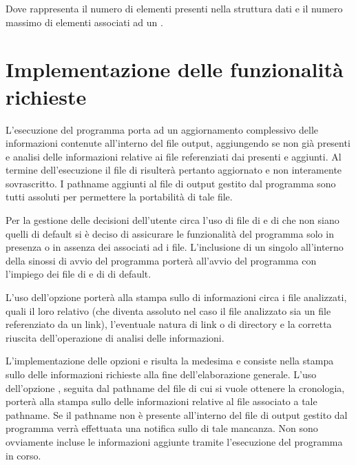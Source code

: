 \documentclass[letterpaper,10pt,italian,openany,oneside]{sphinxmanual}
\begin{document}
Dove  rappresenta il numero di elementi  presenti nella struttura dati e  il numero massimo di elementi  associati ad un .


\section{Implementazione delle funzionalità richieste}
\label{\detokenize{project:implementazione-delle-funzionalita-richieste}}
L’esecuzione del programma porta ad un aggiornamento complessivo delle informazioni contenute all’interno del file output, aggiungendo  se non già presenti e
analisi delle informazioni relative ai file referenziati dai  presenti e aggiunti. Al termine dell’esecuzione il file di  risulterà pertanto aggiornato e
non interamente sovrascritto. I pathname aggiunti al file di output gestito dal programma sono tutti assoluti per permettere la portabilità di tale file.

Per la gestione delle decisioni dell’utente circa l’uso di file di  e di  che non siano quelli di default si è deciso di assicurare le funzionalità del programma
solo in presenza o in assenza dei  associati ad  i file. L’inclusione di un singolo  all’interno della sinossi di avvio del programma porterà
all’avvio del programma con l’impiego dei file di  e di  di default.

L’uso dell’opzione  porterà alla stampa sullo  di informazioni circa i file analizzati, quali il loro  relativo (che diventa assoluto nel caso il file
analizzato sia un file referenziato da un link), l’eventuale natura di link o di directory e la corretta riuscita dell’operazione di analisi delle informazioni.

L’implementazione delle opzioni  e  risulta la medesima e consiste nella stampa sullo  delle informazioni richieste alla fine dell’elaborazione generale.
L’uso dell’opzione , seguita dal pathname del file di cui si vuole ottenere la cronologia, porterà alla stampa sullo  delle informazioni relative al file associato a tale pathname.
Se il pathname non è presente all’interno del file di output gestito dal programma verrà effettuata una notifica sullo  di tale mancanza. Non sono ovviamente incluse le informazioni
aggiunte tramite l’esecuzione del programma in corso.
\end{document}
